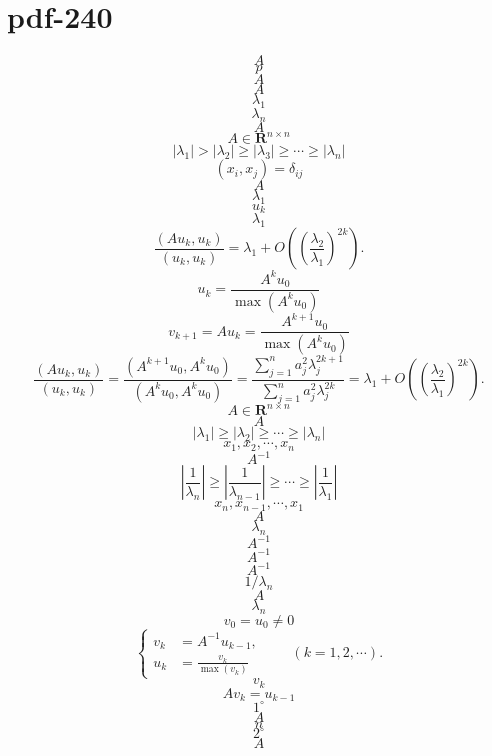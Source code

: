 \documentclass[fontset=fandol]{ctexart}
\begin{document}
\section*{pdf-240}
\[
A
\]
\[
p
\]
\[
A
\]
\[
A
\]
\[
\lambda_1
\]
\[
\lambda_n
\]
\[
A
\]
\[
A\in\mathbf R^{n\times n}
\]
\[
|\lambda_1|>|\lambda_2|\geq|\lambda_3|\geq\cdots\geq|\lambda_n|
\]
\[
(x_i,x_j)=\delta_{ij}
\]
\[
A
\]
\[
\lambda_1
\]
\[
u_k
\]
\[
\lambda_1
\]
\[
\frac{(Au_k,u_k)}{(u_k,u_k)}=\lambda_1+O\left(\left(\frac{\lambda_2}{\lambda_1}\right)^{2k}\right).
\]
\[
u_k=\dfrac{A^ku_0}{\max(A^ku_0)}
\]
\[
v_{k+1}=Au_k=\dfrac{A^{k+1}u_0}{\max(A^ku_0)}
\]
\[
\frac{(Au_k,u_k)}{(u_k,u_k)}=\frac{(A^{k+1}u_0,A^ku_0)}{(A^ku_0,A^ku_0)}=\frac{\displaystyle\sum_{j=1}^na_j^2\lambda_j^{2k+1}}{\displaystyle\sum_{j=1}^na_j^2\lambda_j^{2k}}=\lambda_1+O\left(\left(\frac{\lambda_2}{\lambda_1}\right)^{2k}\right).
\tag{9.2.11}
\]
\[
A\in\mathbf R^{n\times n}
\]
\[
A
\]
\[
|\lambda_1|\geq|\lambda_2|\geq\cdots\geq|\lambda_n|
\]
\[
x_1,x_2,\cdots,x_n
\]
\[
A^{-1}
\]
\[
\left|\dfrac1{\lambda_n}\right|\geq\left|\dfrac1{\lambda_{n-1}}\right|\geq\cdots\geq\left|\dfrac1{\lambda_1}\right|
\]
\[
x_n,x_{n-1},\cdots,x_1
\]
\[
A
\]
\[
\lambda_n
\]
\[
A^{-1}
\]
\[
A^{-1}
\]
\[
A^{-1}
\]
\[
1/\lambda_n
\]
\[
A
\]
\[
\lambda_n
\]
\[
v_0=u_0\ne0
\]
\[
\left\{
\begin{aligned}
v_k&=A^{-1}u_{k-1},\\
u_k&=\frac{v_k}{\max(v_k)}
\end{aligned}
\right.\qquad(k=1,2,\cdots).
\]
\[
v_k
\]
\[
Av_k=u_{k-1}
\]
\[
1^\circ
\]
\[
A
\]
\[
n
\]
\[
2^\circ
\]
\[
A
\]
\end{document}
